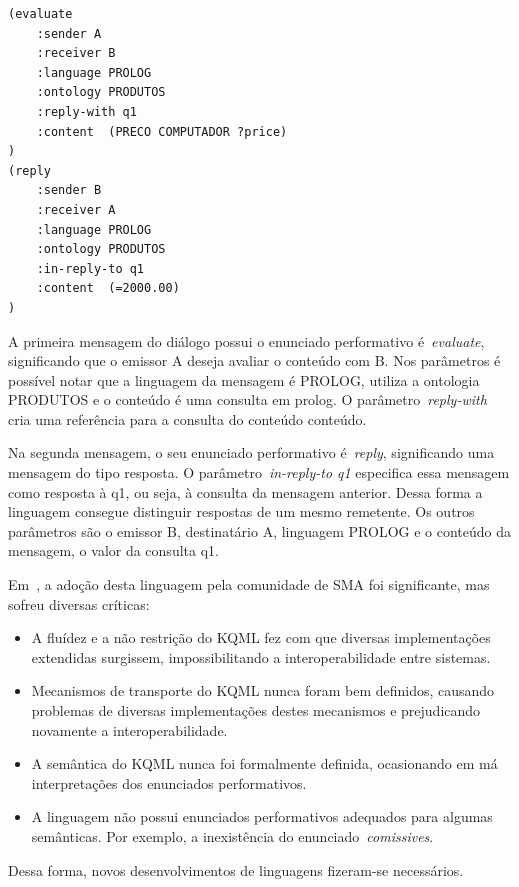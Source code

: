 \begin{lstlisting}[label=code:dialogo-kqml,caption=Exemplo de diálogo em KQML]
(evaluate
	:sender A
	:receiver B
	:language PROLOG
	:ontology PRODUTOS
	:reply-with q1
	:content  (PRECO COMPUTADOR ?price)
)
(reply
	:sender B
	:receiver A
	:language PROLOG
	:ontology PRODUTOS
	:in-reply-to q1
	:content  (=2000.00)
)
\end{lstlisting}

A primeira mensagem do diálogo possui o enunciado performativo é~\emph{evaluate}, significando que o emissor A deseja avaliar o conteúdo com B. Nos parâmetros é possível notar que a linguagem da mensagem é PROLOG, utiliza a ontologia PRODUTOS e o conteúdo é uma consulta em prolog. O parâmetro~\emph{reply-with} cria uma referência para a consulta do conteúdo conteúdo.

Na segunda mensagem, o seu enunciado performativo é~\emph{reply}, significando uma mensagem do tipo resposta. O parâmetro~\emph{in-reply-to q1} especifica essa mensagem como resposta à q1, ou seja, à consulta da mensagem anterior. Dessa forma a linguagem consegue distinguir respostas de um mesmo remetente. Os outros parâmetros são o emissor B, destinatário A, linguagem PROLOG e o conteúdo da mensagem, o valor da consulta q1.

Em~\cite{wooldridge04}, a adoção desta linguagem pela comunidade de SMA foi significante, mas sofreu diversas críticas:
\begin{itemize}
	\item A fluídez e a não restrição do KQML fez com que diversas implementações extendidas surgissem, impossibilitando a interoperabilidade entre sistemas.
	\item Mecanismos de transporte do KQML nunca foram bem definidos, causando problemas de diversas implementações destes mecanismos e prejudicando novamente a interoperabilidade.
	\item A semântica do KQML nunca foi formalmente definida, ocasionando em má interpretações dos enunciados performativos.
	\item A linguagem não possui enunciados performativos adequados para algumas semânticas. Por exemplo, a inexistência do enunciado~\emph{comissives}.
\end{itemize}

Dessa forma, novos desenvolvimentos de linguagens fizeram-se necessários.

